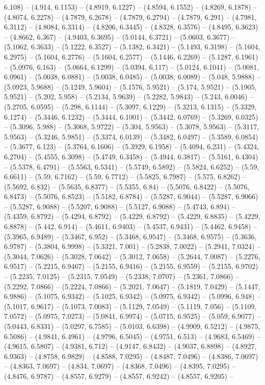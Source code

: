 6.108) -- (4.914, 6.1153) -- (4.8919, 6.1227) -- (4.8594, 6.1552) -- (4.8269, 6.1878) -- (4.8074, 6.2278) -- (4.7879, 6.2678) -- (4.7879, 6.2794) -- (4.7879, 6.291) -- (4.7981, 6.3112) -- (4.8084, 6.3314) -- (4.8206, 6.3445) -- (4.8328, 6.3576) -- (4.8495, 6.3623) -- (4.8662, 6.367) -- (4.9403, 6.3695) -- (5.0144, 6.3721) -- (5.0603, 6.3677) -- (5.1062, 6.3633) -- (5.1222, 6.3527) -- (5.1382, 6.3421) -- (5.1493, 6.3198) -- (5.1604, 6.2975) -- (5.1604, 6.2776) -- (5.1604, 6.2577) -- (5.1446, 6.2269) -- (5.1287, 6.1961) -- (5.0976, 6.163) -- (5.0664, 6.1299) -- (5.0394, 6.117) -- (5.0124, 6.1041) -- (5.0081, 6.0961) -- (5.0038, 6.0881) -- (5.0038, 6.0485) -- (5.0038, 6.0089) -- (5.048, 5.9888) -- (5.0923, 5.9688) -- (5.1249, 5.9604) -- (5.1576, 5.9521) -- (5.174, 5.9521) -- (5.1905, 5.9521) -- (5.202, 5.958) -- (5.2134, 5.9639) -- (5.2282, 5.9843) -- (5.243, 6.0046) -- (5.2705, 6.0595) -- (5.298, 6.1144) -- (5.3097, 6.1229) -- (5.3213, 6.1315) -- (5.3329, 6.1274) -- (5.3446, 6.1232) -- (5.3444, 6.1001) -- (5.3442, 6.0769) -- (5.3269, 6.0325) -- (5.3096, 5.988) -- (5.3068, 5.9722) -- (5.304, 5.9563) -- (5.3078, 5.9563) -- (5.3117, 5.9563) -- (5.3246, 5.9851) -- (5.3374, 6.0139) -- (5.3482, 6.0497) -- (5.3589, 6.0854) -- (5.3677, 6.123) -- (5.3764, 6.1606) -- (5.3929, 6.1958) -- (5.4094, 6.231) -- (5.4324, 6.2704) -- (5.4555, 6.3098) -- (5.4749, 6.3458) -- (5.4944, 6.3817) -- (5.5161, 6.4304) -- (5.5378, 6.4791) -- (5.5563, 6.5341) -- (5.5749, 6.5892) -- (5.5824, 6.6252) -- (5.59, 6.6611) -- (5.59, 6.7162) -- (5.59, 6.7712) -- (5.5825, 6.7987) -- (5.575, 6.8262) -- (5.5692, 6.832) -- (5.5635, 6.8377) -- (5.5355, 6.84) -- (5.5076, 6.8422) -- (5.5076, 6.8473) -- (5.5076, 6.8523) -- (5.5182, 6.8784) -- (5.5287, 6.9044) -- (5.5287, 6.9066) -- (5.5287, 6.9088) -- (5.5207, 6.9088) -- (5.5127, 6.9088) -- (5.4743, 6.894) -- (5.4359, 6.8792) -- (5.4294, 6.8792) -- (5.4229, 6.8792) -- (5.4229, 6.8835) -- (5.4229, 6.8878) -- (5.442, 6.914) -- (5.4611, 6.9403) -- (5.4537, 6.9431) -- (5.4462, 6.9458) -- (5.3965, 6.9489) -- (5.3467, 6.952) -- (5.3468, 6.9547) -- (5.3468, 6.9575) -- (5.3636, 6.9787) -- (5.3804, 6.9998) -- (5.3321, 7.001) -- (5.2838, 7.0022) -- (5.2941, 7.0324) -- (5.3044, 7.0626) -- (5.3028, 7.0642) -- (5.3012, 7.0658) -- (5.2644, 7.0087) -- (5.2276, 6.9517) -- (5.2215, 6.9467) -- (5.2155, 6.9416) -- (5.2155, 6.9559) -- (5.2155, 6.9702) -- (5.2235, 7.0125) -- (5.2315, 7.0549) -- (5.2338, 7.0707) -- (5.2361, 7.0866) -- (5.2292, 7.0866) -- (5.2224, 7.0866) -- (5.2021, 7.0647) -- (5.1819, 7.0429) -- (5.1447, 6.9886) -- (5.1075, 6.9342) -- (5.1025, 6.9342) -- (5.0975, 6.9342) -- (5.0996, 6.948) -- (5.1017, 6.9617) -- (5.1073, 7.0083) -- (5.1129, 7.0549) -- (5.1119, 7.056) -- (5.1109, 7.0572) -- (5.0975, 7.0273) -- (5.0841, 6.9974) -- (5.0715, 6.9525) -- (5.059, 6.9077) -- (5.0443, 6.8331) -- (5.0297, 6.7585) -- (5.0103, 6.6398) -- (4.9909, 6.5212) -- (4.9875, 6.5086) -- (4.9841, 6.4961) -- (4.9796, 6.5045) -- (4.9751, 6.513) -- (4.9683, 6.5469) -- (4.9615, 6.5807) -- (4.9381, 6.712) -- (4.9147, 6.8432) -- (4.9037, 6.8898) -- (4.8927, 6.9363) -- (4.8758, 6.9829) -- (4.8588, 7.0295) -- (4.8487, 7.0496) -- (4.8386, 7.0697) -- (4.8363, 7.0697) -- (4.834, 7.0697) -- (4.8368, 7.0496) -- (4.8395, 7.0295) -- (4.8476, 6.9787) -- (4.8557, 6.9279) -- (4.8557, 6.9242) -- (4.8557, 6.9205) -- 